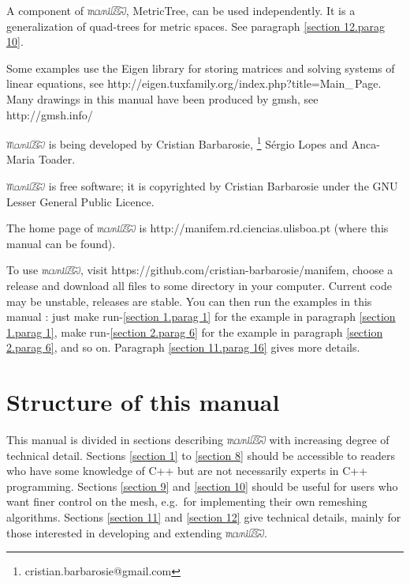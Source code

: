 \documentclass[a4paper]{scrreprt}
\def\numb{}
\newcommand\ManiFEM{\leavevmode\hbox{\includegraphics[width=13mm]{manifem-large}}}
\newcommand\maniFEM{\leavevmode\hbox{\includegraphics[width=13mm]{manifem-small}}}
\renewcommand\tt{\normalfont\ttfamily}
\begin{document}
A component of \maniFEM, {\small\tt MetricTree}, can be used independently.
It is a generalization of quad-trees for metric spaces.
See paragraph \ref{\numb section 12.\numb parag 10}.

Some examples use the {\small\tt Eigen} library for  storing matrices and solving systems of
linear equations, see {\small\tt http://eigen.tuxfamily.org/index.php?title=Main\_\,Page}.
Many drawings in this manual have been produced by {\small\tt gmsh}, see
{\small\tt http://gmsh.info/}

{\ManiFEM} is being developed by Cristian Barbarosie,%
\footnote {\small\tt cristian.barbarosie@gmail.com}
S\'ergio Lopes and Anca-Maria Toader.

{\ManiFEM} is free software; it is copyrighted by Cristian Barbarosie
under the GNU Lesser General Public Licence.

The home page of {\maniFEM} is {\small\tt http://manifem.rd.ciencias.ulisboa.pt}
(where this manual can be found).

To use \maniFEM, visit {\small\tt https://github.com/cristian-barbarosie/manifem},
choose a release and download all files to some directory in your computer.
Current code may be unstable, releases are stable.
You can then run the examples in this manual :
just {\small\tt make run-\ref{\numb section 1.\numb parag 1}}
for the example in paragraph \ref{\numb section 1.\numb parag 1},
{\small\tt make run-\ref{\numb section 2.\numb parag 6}}
for the example in paragraph \ref{\numb section 2.\numb parag 6}, and so on.
Paragraph \ref{\numb section 11.\numb parag 16} gives more details.
\vfil\eject


\section*{Structure of this manual}

This manual is divided in sections describing {\maniFEM} with increasing degree of technical
detail.
Sections \ref{\numb section 1} to \ref{\numb section 8} should be accessible to readers
who have some knowledge of {\tt C++} but are not necessarily experts in {\tt C++} programming.
Sections \ref{\numb section 9} and \ref{\numb section 10} should be useful for users
who want finer control on the mesh, e.g.\ for implementing their own remeshing algorithms.
Sections \ref{\numb section 11} and \ref{\numb section 12} give technical details,
mainly for those interested in developing and extending \maniFEM.
\end{document}
